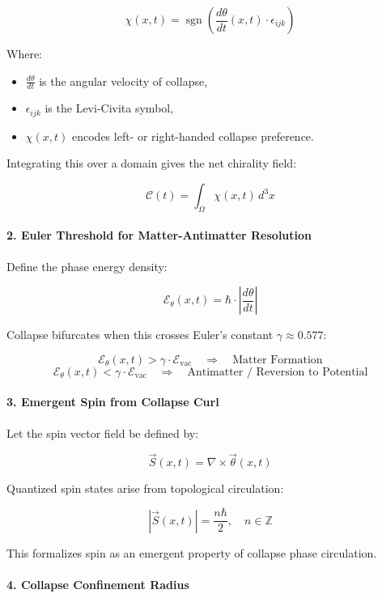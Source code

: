 \[
\chi(x,t) = \operatorname{sgn} \left( \frac{d\theta}{dt}(x,t) \cdot \epsilon_{ijk} \right)
\]

Where:
\begin{itemize}
  \item $\frac{d\theta}{dt}$ is the angular velocity of collapse,
  \item $\epsilon_{ijk}$ is the Levi-Civita symbol,
  \item $\chi(x,t)$ encodes left- or right-handed collapse preference. \cite{collapse_foundations} \end{itemize}

Integrating this over a domain gives the net chirality field:

\[
\mathcal{C}(t) = \int_{\Omega} \chi(x,t) \, d^3x
\]

\paragraph{2. \cite{collapse_foundations} Euler Threshold for Matter-Antimatter Resolution}

Define the phase energy density:

\[
\mathcal{E}_\theta(x,t) = \hbar \cdot \left| \frac{d\theta}{dt} \right|
\]

Collapse bifurcates when this crosses Euler’s constant $\gamma \approx 0.577$:

\[
\mathcal{E}_\theta(x,t) >
\gamma \cdot \mathcal{E}_{\text{vac}} \quad \Rightarrow \quad \text{Matter Formation}
\]
\[
\mathcal{E}_\theta(x,t) <
\gamma \cdot \mathcal{E}_{\text{vac}} \quad \Rightarrow \quad \text{Antimatter / Reversion to Potential}
\]

\paragraph{3. \cite{collapse_foundations} Emergent Spin from Collapse Curl}

Let the spin vector field be defined by:

\[
\vec{S}(x,t) = \nabla \times \vec{\theta}(x,t)
\]

Quantized spin states arise from topological circulation:

\[
|\vec{S}(x,t)| = \frac{n \hbar}{2}, \quad n \in \mathbb{Z}
\]

This formalizes spin as an emergent property of collapse phase circulation. \cite{collapse_foundations} \paragraph{4. Collapse Confinement Radius}

